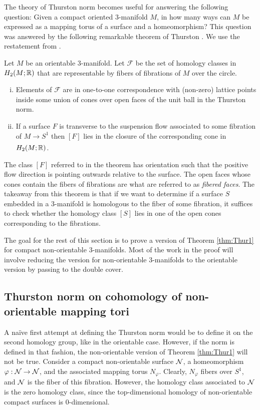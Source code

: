 The theory of Thurston norm becomes useful for answering the following question: Given a compact oriented $3$-manifold $M$, in how many ways can $M$ be expressed as a mapping torus of a surface and a homeomorphism?
This question was answered by the following remarkable theorem of Thurston \cite{thurston1986norm}.
We use the restatement from \cite{yazdi2018pseudo}.
\begin{thm}[Thurston]
  \label{thm:Thur1}
  Let $M$ be an orientable 3-manifold.  Let $\mathcal{F}$ be the set of homology classes in $H_2(M; \mathbb{R})$ that are representable by fibers of fibrations of $M$ over the circle.
\begin{enumerate}[(i)]
\item Elements of $\mathcal{F}$ are in one-to-one correspondence with (non-zero) lattice points inside some union of cones over open faces of the unit ball in the Thurston norm.
\item If a surface $F$ is transverse to the suspension flow associated to some fibration of
  $M \xrightarrow[]{} S^1$ then $[F]$ lies in the closure of the corresponding cone in $H_2(M;\mathbb{R})$.
\end{enumerate}
\end{thm}
The class $[F]$ referred to in the theorem has orientation such that the positive flow direction is pointing outwards relative to the surface.
The open faces whose cones contain the fibers of fibrations are what are referred to as \emph{fibered faces}.
The takeaway from this theorem is that if we want to determine if a surface $S$ embedded in a $3$-manifold is homologous to the fiber of some fibration, it suffices to check whether the homology class $[S]$ lies in one of the open cones corresponding to the fibrations.

The goal for the rest of this section is to prove a version of Theorem \ref{thm:Thur1} for compact non-orientable $3$-manifolds.
Most of the work in the proof will involve reducing the version for non-orientable $3$-manifolds to the orientable version by passing to the double cover.

\subsection{Thurston norm on cohomology of non-orientable mapping tori}
\label{sec:thurst-norm-cohom}

A na\"ive first attempt at defining the Thurston norm would be to define it on the second homology group, like in the orientable case.
However, if the norm is defined in that fashion, the non-orientable version of Theorem \ref{thm:Thur1} will not be true.
Consider a compact non-orientable surface $\mathcal{N}$, a homeomorphism $\varphi: \mathcal{N} \to \mathcal{N}$, and the associated mapping torus $N_{\varphi}$.
Clearly, $N_{\varphi}$ fibers over $S^1$, and $\mathcal{N}$ is the fiber of this fibration.  However, the homology class associated to $\mathcal{N}$ is the zero homology class, since the top-dimensional homology of non-orientable compact surfaces is $0$-dimensional.

